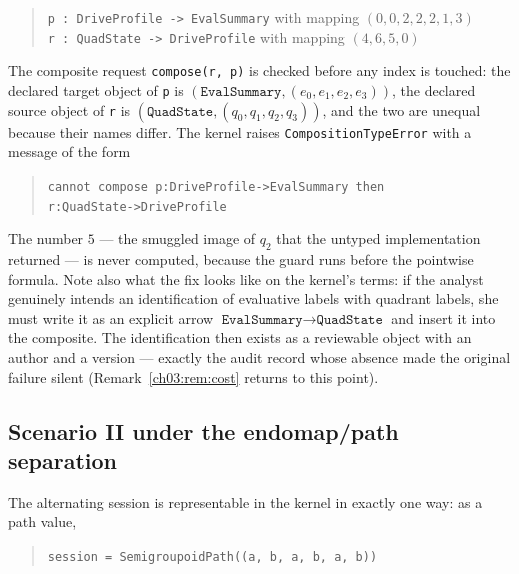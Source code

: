 \begin{quote}
\texttt{p : DriveProfile -> EvalSummary} \quad with mapping
$(0, 0, 2, 2, 2, 1, 3)$\\
\texttt{r : QuadState -> DriveProfile} \quad with mapping
$(4, 6, 5, 0)$
\end{quote}

The composite request \texttt{compose(r, p)} is checked before any index
is touched: the declared target object of \texttt{p} is
$(\texttt{EvalSummary}, (e_0, e_1, e_2, e_3))$, the declared source
object of \texttt{r} is $(\texttt{QuadState}, (q_0, q_1, q_2, q_3))$,
and the two are unequal because their names differ. The kernel raises
\texttt{CompositionTypeError} with a message of the form

\begin{quote}
\texttt{cannot compose p:DriveProfile->EvalSummary then}\\
\texttt{r:QuadState->DriveProfile}
\end{quote}

The number $5$ --- the smuggled image of $q_2$ that the untyped
implementation returned --- is never computed, because the guard runs
before the pointwise formula. Note also what the fix looks like on the
kernel's terms: if the analyst genuinely intends an identification of
evaluative labels with quadrant labels, she must write it as an explicit
arrow $\texttt{EvalSummary} \to \texttt{QuadState}$ and insert it into
the composite. The identification then exists as a reviewable object
with an author and a version --- exactly the audit record whose absence
made the original failure silent
(Remark~\ref{ch03:rem:cost} returns to this point).

\subsection{Scenario II under the endomap/path separation}

The alternating session is representable in the kernel in exactly one
way: as a path value,

\begin{quote}
\texttt{session = SemigroupoidPath((a, b, a, b, a, b))}
\end{quote}

